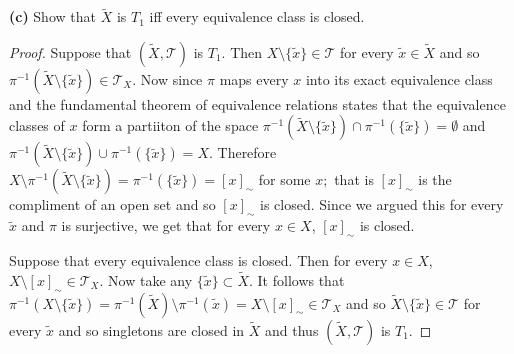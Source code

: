 \documentclass[11pt]{amsart}
\theoremstyle{definition}
\numberwithin{theorem}{section}
\numberwithin{definition}{section}
\numberwithin{equation}{section}
\def\scriptt{{\mathcal T}}
\begin{document}
\noindent \textbf{(c)} Show that $\tilde X$ is $T_1$ iff every equivalence class is closed.
\begin{proof}
	Suppose that $(\tilde X, \scriptt)$ is $T_1$. Then $X \setminus \{\tilde x\} \in \scriptt$ for every $\tilde x \in \tilde X$ and so
	$\pi^{-1}(\tilde X \setminus \{\tilde x\}) \in \scriptt_X.$ Now since $\pi$ maps every $x$ into its exact equivalence class and the fundamental theorem of equivalence relations states that the equivalence classes of $x$ form a partiiton of the space $\pi^{-1}(\tilde X \setminus \{\tilde x\}) \cap \pi^{-1}(\{\tilde x\}) = \emptyset$
	and $\pi^{-1}(\tilde X \setminus \{\tilde x\}) \cup \pi^{-1}(\{\tilde x\}) = X$. Therefore $X \setminus  \pi^{-1}(\tilde X \setminus \{\tilde x\}) =  \pi^{-1}(\{\tilde x\}) = [x]_\sim$ for some $x;$ that is $[x]_\sim$ is the compliment of an open set and so $[x]_\sim$ is closed. Since we argued this for every $\tilde x$ and $\pi$ is surjective, we get that for every $x \in X$, $[x]_\sim$ is closed.

	Suppose that every equivalence class is closed. Then for every $x \in X$, $X \setminus [x]_\sim \in \scriptt_X.$  
	Now take any $\{\tilde x\} \subset \tilde X.$ It follows that $\pi^{-1}(X \setminus \{\tilde x\}) = \pi^{-1}(\tilde X) \setminus \pi^{-1}(\tilde x) = X \setminus [x]_\sim \in \scriptt_X$ and so $\tilde X \setminus \{\tilde x\}\in \scriptt$ for every $\tilde x$ and so singletons are closed in $\tilde X$ and thus $(\tilde X, \scriptt)$ is $T_1$.
\end{proof}
\end{document}
